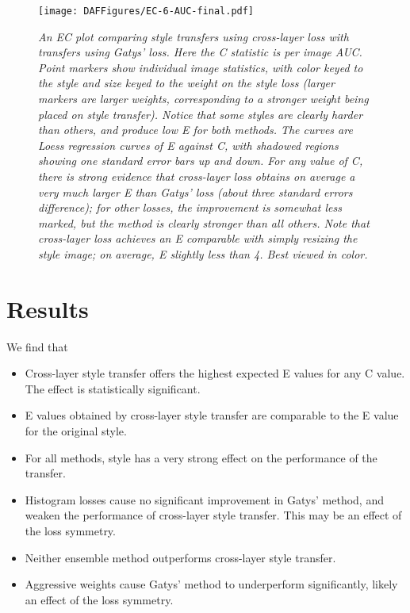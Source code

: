 \documentclass[runningheads]{llncs}
\begin{document}
\begin{figure*}[!ht]
    \texttt{[image: DAFFigures/EC-6-AUC-final.pdf]}
\caption{\em An EC plot comparing style transfers using cross-layer loss with transfers using Gatys' loss.  Here the C
  statistic is per image AUC.  Point markers show individual image
  statistics, with color keyed
  to the style and size keyed to the weight on the style loss (larger markers are larger
  weights, corresponding to a stronger weight being placed on style transfer).  Notice that some styles are clearly harder than others, and produce
  low E for both methods.  The curves are Loess regression curves of E against C, with shadowed regions showing one
  standard error bars up and down.  For any value of C, there is strong evidence that cross-layer loss obtains on
  average a very much larger E than Gatys' loss (about three standard errors difference); for other losses, the
  improvement is somewhat less marked, but the method is clearly stronger than all others.  Note that cross-layer loss
  achieves an E comparable with simply resizing the style image; on
  average, E slightly less than 4. Best viewed in color.}
\label{ecxvg}
\end{figure*}

\section{Results\label{results}}

We find that
\begin{itemize}
\item Cross-layer style transfer offers the highest expected E values for any C value.  The effect is statistically 
  significant. 
\item E values obtained by cross-layer style transfer are comparable to the E value for the original style.
\item For all methods, style has a very strong effect on the performance of the transfer.
\item Histogram losses cause no significant improvement in Gatys' method, and weaken the performance of cross-layer
  style transfer.  This may be an effect of the loss symmetry.
\item Neither ensemble method outperforms cross-layer style transfer. 
\item Aggressive weights cause Gatys' method to underperform significantly, likely an effect of the loss symmetry.
\end{itemize}
\end{document}
